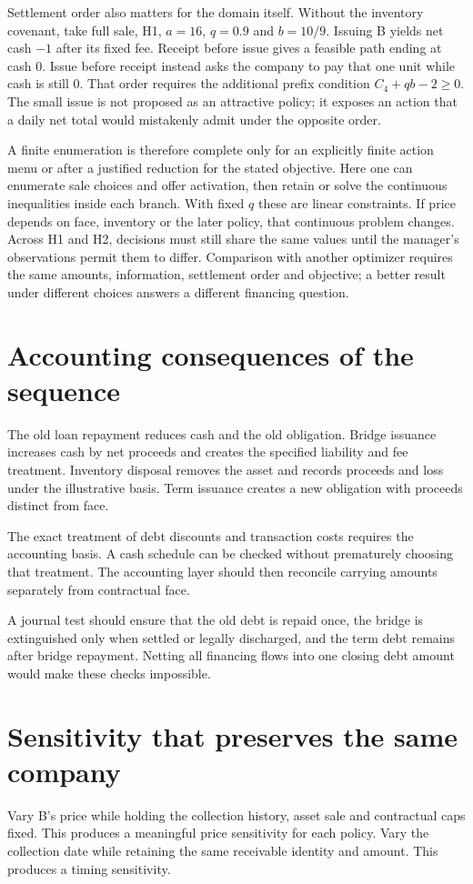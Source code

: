 Settlement order also matters for the domain itself. Without the inventory
covenant, take full sale, H1,
$a=16$, $q=0.9$ and $b=10/9$. Issuing B yields net cash $-1$ after its fixed
fee. Receipt before issue gives a feasible path ending at cash 0. Issue before
receipt instead asks the company to pay that one unit while cash is still 0.
That order requires the additional prefix condition $C_4+qb-2\geq0$.
The small issue is not proposed as an attractive policy; it exposes an action
that a daily net total would mistakenly admit under the opposite order.

A finite enumeration is therefore complete only for an explicitly finite
action menu or after a justified reduction for the stated objective. Here one
can enumerate sale choices and offer activation, then retain or solve the
continuous inequalities inside each branch. With fixed $q$ these are linear
constraints. If price depends on face, inventory or the later policy, that
continuous problem changes. Across H1 and H2, decisions must still share the
same values until the manager's observations permit them to differ. Comparison
with another optimizer requires the same amounts, information, settlement
order and objective; a better result under different choices answers a
different financing question.

\section{Accounting consequences of the sequence}
The old loan repayment reduces cash and the old obligation. Bridge issuance increases cash by net proceeds and creates the specified liability and fee treatment. Inventory disposal removes the asset and records proceeds and loss under the illustrative basis. Term issuance creates a new obligation with proceeds distinct from face.

The exact treatment of debt discounts and transaction costs requires the accounting basis. A cash schedule can be checked without prematurely choosing that treatment. The accounting layer should then reconcile carrying amounts separately from contractual face.

A journal test should ensure that the old debt is repaid once, the bridge is extinguished only when settled or legally discharged, and the term debt remains after bridge repayment. Netting all financing flows into one closing debt amount would make these checks impossible.

\section{Sensitivity that preserves the same company}
Vary B's price while holding the collection history, asset sale and contractual caps fixed. This produces a meaningful price sensitivity for each policy. Vary the collection date while retaining the same receivable identity and amount. This produces a timing sensitivity.

